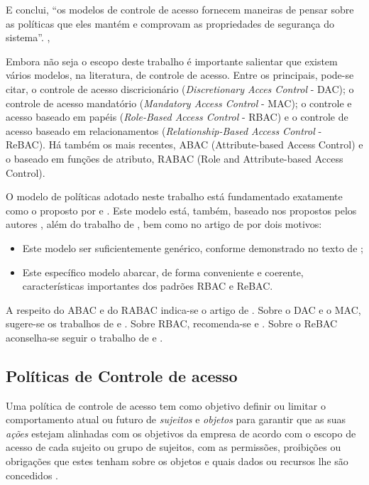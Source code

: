 E conclui, ``os modelos de controle de acesso fornecem maneiras de pensar sobre as políticas que eles mantém e comprovam as propriedades de segurança do sistema''. \cite[p. 264]{wang_conflicts_2010},

Embora não seja o escopo deste trabalho é importante salientar que existem vários modelos, na literatura, de controle de acesso. Entre os principais, pode-se citar, o controle de acesso discricionário (\textit{Discretionary Acces Control} - DAC); o controle de acesso mandatório (\textit{Mandatory Access Control} - MAC); o controle e acesso baseado em papéis (\textit{Role-Based Access Control} - RBAC) e o controle de acesso baseado em relacionamentos (\textit{Relationship-Based Access Control} - ReBAC). Há também os mais recentes, ABAC (Attribute-based Access Control) e o baseado em funções de atributo, RABAC (Role and Attribute-based Access Control).

O modelo de políticas adotado neste trabalho está fundamentado exatamente como o proposto por  e \cite{sarkis:artigo:2016}. Este modelo está, também, baseado nos propostos pelos autores , além do trabalho de , bem como no artigo de  por dois motivos:
\begin{itemize}
	\item Este modelo ser suficientemente genérico, conforme demonstrado no texto de \cite{sarkar_2017};
	\item Este específico modelo abarcar, de forma conveniente e coerente, características importantes dos padrões RBAC e ReBAC.
\end{itemize}

A respeito do ABAC e do RABAC indica-se o artigo de . Sobre o DAC e o MAC, sugere-se os trabalhos de  e . Sobre RBAC, recomenda-se  e . Sobre o ReBAC aconselha-se seguir o trabalho de  e .

\subsection{Políticas de Controle de acesso}\label{controle_acesso}

Uma política de controle de acesso tem como objetivo definir ou limitar o comportamento atual ou futuro de \textit{sujeitos} e \textit{objetos} para garantir que as suas \textit{ações} estejam alinhadas com os objetivos da empresa de acordo com o escopo de acesso de cada sujeito ou grupo de sujeitos, com as permissões, proibições ou obrigações que estes tenham sobre os objetos e quais dados ou recursos lhe são concedidos \cite{dunlop_dynamic_2002}\cite{sarkis2017}.

